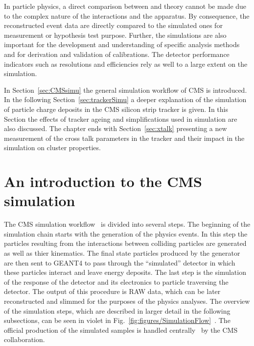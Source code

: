 
\clearpage

\setcounter{secnumdepth}{4}
\setcounter{secnumdepth}{5}

In particle physics, a direct comparison between and theory cannot be made due to the complex nature of the interactions and the apparatus. By consequence, the reconstructed event data are directly compared to the simulated ones for measurement or hypothesis test purpose. Further, the simulations are also important for the development and understanding of specific analysis methods and for derivation and validation of calibrations. The detector performance indicators such as resolutions and efficiencies rely as well to a large extent on the simulation.

In Section~\ref{sec:CMSsimu} the general simulation workflow of CMS is introduced. In the following Section~\ref{sec:trackerSimu} a deeper explanation of the simulation of particle charge deposits in the CMS silicon strip tracker is given. In this Section the effects of tracker ageing and simplifications used in simulation are also discussed. The chapter ends with Section~\ref{sec:xtalk} presenting a new measurement of the cross talk parameters in the tracker and their impact in the simulation on cluster properties.

\section{An introduction to the CMS simulation~\label{sec:CMSsimu}}

The CMS simulation workflow~\cite{Banerjee:2007zz, Hildreth:2017vpw, Hildreth:2015kps} is divided into several steps. The beginning of the simulation chain starts with the generation of the physics events. In this step the  particles resulting from the interactions between colliding particles are generated as well as thier kinematics. The final state particles produced by the generator are then sent to GEANT4 to pass through the ``simulated'' detector in which these particles interact and leave energy deposits. The last step is the simulation of the response of the detector and its electronics to particle traversing the detector. The output of this procedure is RAW data, which can be later reconstructed and slimmed for the purposes of the physics analyses. The overview of the simulation steps, which are described in larger detail in the following subsections, can be seen in violet in Fig.~\ref{fig:figures/SimulationFlow}~\cite{website:simuBasics}. The official production of the simulated samples is handled centrally~\cite{Boudoul:2015bkp} by the CMS collaboration.


